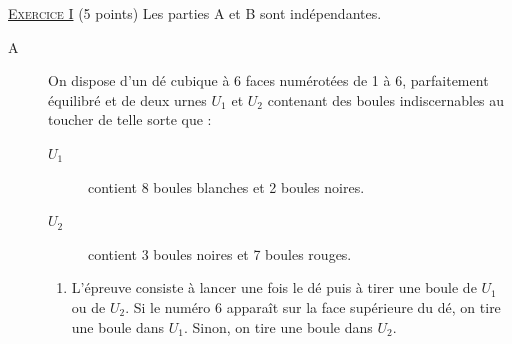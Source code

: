 \noindent \underline{\textsc{Exercice I}} (5 points) 
       Les parties A et B sont ind\'ependantes. 
      \begin{description}
            \item[A] On dispose d'un d\'e cubique \`a 6 faces num\'erot\'ees de 1 \`a 6,
                     parfaitement \'equilibr\'e et de deux urnes $U_1$ et $U_2$ contenant des boules
                     indiscernables au toucher de telle sorte que :
                     \begin{description}
                           \item[$U_1$] contient 8 boules blanches et 2 boules noires.
                           \item[$U_2$] contient 3 boules noires et 7 boules rouges.
                     \end{description}
                     \begin{enumerate}
                           \item L'\'epreuve consiste \`a lancer une fois le d\'e puis \`a 
                                 tirer une boule de $U_1$ ou de $U_2$.
                                 Si le num\'ero 6 appara\^it sur la face sup\'erieure du d\'e, on tire une boule dans $U_1$.
                                 Sinon, on tire une boule dans $U_2$.
                                 

\end{enumerate}
\end{description}
